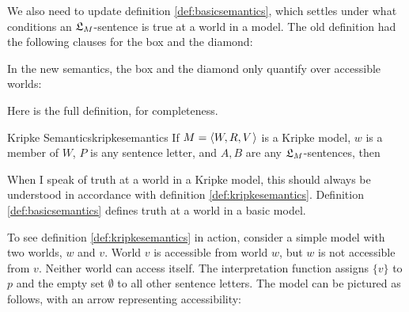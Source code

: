 We also need to update definition \ref{def:basicsemantics}, which settles under
what conditions an $\mathfrak{L}_M$-sentence is true at a world in a model. The old
definition had the following clauses for the box and the diamond:

\bigskip
\begin{semantics}
\end{semantics}
\bigskip

\noindent%
In the new semantics, the box and the diamond only quantify over
accessible worlds:

\bigskip
\begin{semantics}
\end{semantics}
\bigskip

Here is the full definition, for completeness.

\begin{definition}{Kripke Semantics}{kripkesemantics}
  If $\Mfr = \t{W,R,V}$ is a Kripke model, $w$ is a member of $W$, $P$ is
  any sentence letter, and $A,B$ are any $\mathfrak{L}_M$-sentences, then

  \medskip
  \begin{semantics}
  \end{semantics}
\end{definition}
%
When I speak of truth at a world in a Kripke model, this should always be
understood in accordance with definition \ref{def:kripkesemantics}. Definition
\ref{def:basicsemantics} defines truth at a world in a basic model.

To see definition \ref{def:kripkesemantics} in action, consider a simple model
with two worlds, $w$ and $v$. World $v$ is accessible from world $w$, but $w$ is
not accessible from $v$. Neither world can access itself. The interpretation
function assigns $\{ v \}$ to $p$ and the empty set $\emptyset$ to all other
sentence letters. The model can be pictured as follows, with an arrow
representing accessibility:


